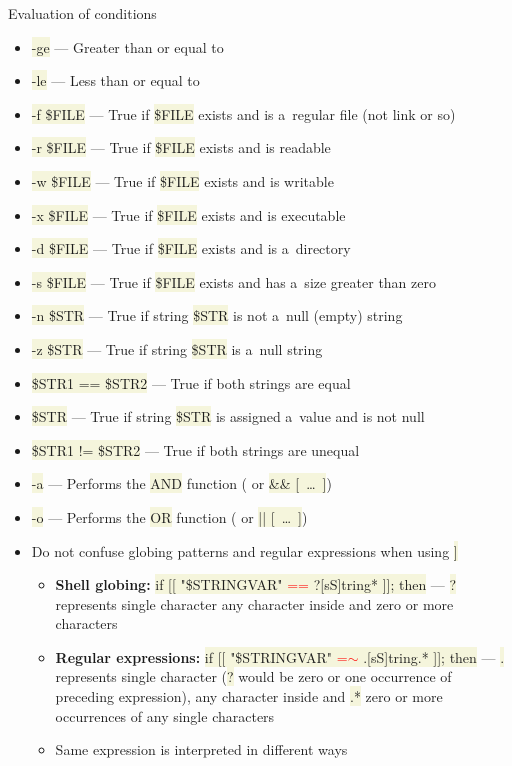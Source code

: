 \documentclass[compress, ucs, xelatex, 11pt, xcolor=svgnames, aspectratio=169,
	hyperref={
		bookmarks=true,
		unicode=true,
		colorlinks=true,
		pdftitle={Linux, command line and MetaCentrum},
		plainpages=false,
		pdfauthor={Vojtech Zeisek},
		pdfsubject={Course about use of Linux command line, writing shell scripts and using MetaCentrum of CESNET},
		pdfcreator={XeLaTeX},
		pdfkeywords={Linux, GNU, BASH, shell, command line, MetaCentrum},
		linkcolor=DarkRed, %
		anchorcolor=DarkBlue, %
		citecolor=Indigo, %
		filecolor=NavyBlue, %
		menucolor=DarkMagenta, %
		urlcolor=DarkBlue, %
		pdftex},
	url={hyphens, lowtilde} %
	]{beamer}
\renewcommand{\texttt}[1]{\colorbox{Beige}{{\ttfamily #1}}}
\renewcommand{\alert}[1]{\textcolor{red}{#1}}
\begin{document}
\begin{frame}[allowframebreaks]{Evaluation of conditions}
\begin{itemize}
		\item \texttt{-ge} --- Greater than or equal to
		\item \texttt{-le} --- Less than or equal to
		\item \texttt{-f \$FILE} --- True if \texttt{\$FILE} exists and is a~regular file (not link or so)
		\item \texttt{-r \$FILE} --- True if \texttt{\$FILE} exists and is readable
		\item \texttt{-w \$FILE} --- True if \texttt{\$FILE} exists and is writable
		\item \texttt{-x \$FILE} --- True if \texttt{\$FILE} exists and is executable
		\item \texttt{-d \$FILE} --- True if \texttt{\$FILE} exists and is a~directory
		\item \texttt{-s \$FILE} --- True if \texttt{\$FILE} exists and has a~size greater than zero
		\item \texttt{-n \$STR} --- True if string \texttt{\$STR} is not a~null (empty) string
		\item \texttt{-z \$STR} --- True if string \texttt{\$STR} is a~null string
		\item \texttt{\$STR1 == \$STR2} --- True if both strings are equal
		\item \texttt{\$STR} --- True if string \texttt{\$STR} is assigned a~value and is not null
		\item \texttt{\$STR1 != \$STR2} --- True if both strings are unequal
		\item \texttt{-a} --- Performs the \texttt{AND} function (\texttt{[~\ldots~-a~\ldots~]} or \texttt{[~\ldots~] \&\& [~\ldots~]})
		\item \texttt{-o} --- Performs the \texttt{OR} function (\texttt{[~\ldots~-o~\ldots~]} or \texttt{[~\ldots~] || [~\ldots~]})
		\item Do not confuse globing patterns and regular expressions when using \texttt{[[~\ldots~]]}
		\begin{itemize}
			\item \textbf{Shell globing:} \texttt{if [[ "\$STRINGVAR" \alert{==} ?[sS]tring* ]]; then} --- \texttt{?} represents single character \texttt{[]} any character inside and \texttt{*} zero or more characters
			\item \textbf{Regular expressions:} \texttt{if [[ "\$STRINGVAR" \alert{=$\sim$} .[sS]tring.* ]]; then} --- \texttt{.} represents single character (\texttt{?} would be zero or one occurrence of preceding expression), \texttt{[]} any character inside and \texttt{.*} zero or more occurrences of any single characters
			\item Same expression is interpreted in different ways
		\end{itemize}
	\end{itemize}
\end{frame}
\end{document}
